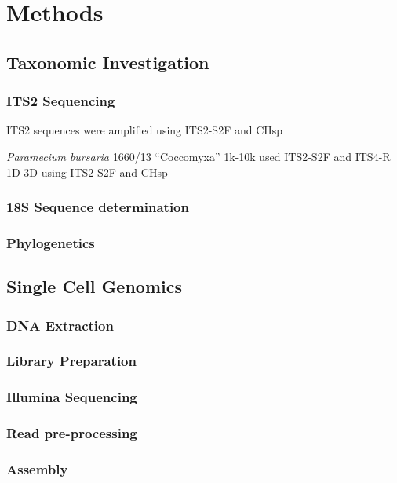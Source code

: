 \section{Methods}

\subsection{Taxonomic Investigation}
    
\subsubsection{ITS2 Sequencing}

ITS2 sequences were amplified using ITS2-S2F and CHsp 



\textit{Paramecium bursaria} 1660/13 ``Coccomyxa'' 
1k-10k used ITS2-S2F and ITS4-R
1D-3D using ITS2-S2F and CHsp




\subsubsection{18S Sequence determination}

\subsubsection{Phylogenetics}

\subsection{Single Cell Genomics}

\subsubsection{DNA Extraction}
\subsubsection{Library Preparation}
\subsubsection{Illumina Sequencing}
\subsubsection{Read pre-processing}
\subsubsection{Assembly}
